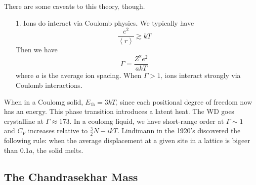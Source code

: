 \documentclass[10pt]{article}
\numberwithin{equation}{section}
\newcommand{\n}{\noindent}
\newcommand{\avg}[1]{\left\langle#1\right\rangle}
\begin{document}
    \n There are some caveats to this theory, though. 
    \begin{enumerate}
    \item[1.] Ions do interact via Coulomb physics. We typically have
      \begin{equation}
        \label{eq:305}
        \frac{e^2}{\avg{r}}\gtrsim kT
      \end{equation}
      Then we have
      \begin{equation}
        \label{eq:306}
        \Gamma = \frac{Z^2 e^2}{a kT}
      \end{equation}
      where $a$ is the average ion spacing. When $\Gamma>1$, ions
      interact strongly via Coulomb interactions. 
    \end{enumerate}
    When in a Coulomg solid, $E_{\mathrm{th}}=3kT$, since each
    positional degree of freedom now has an energy. This phase
    transition introduces a latent heat. The WD goes crystalline at
    $\Gamma\approx 173$. In a coulomg liquid, we have short-range
    order at $\Gamma\sim1$ and $C_V$ increases relative to
    $\frac{3}{2}N-i kT$. Lindimann in the 1920's discovered the
    following rule: when the average displacement at a given site in a
    lattice is bigeer than $0.1a$, the solid melts.

    \subsection{The Chandrasekhar Mass}
    \label{sec:chandrasekhar-mass}
\end{document}
